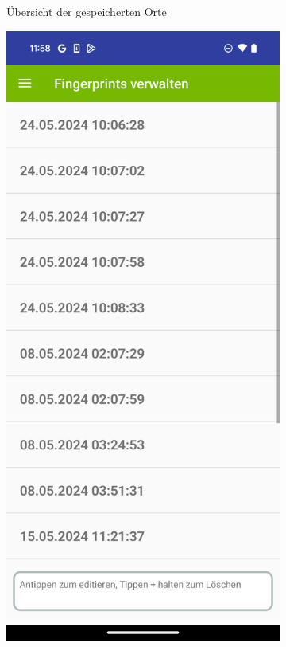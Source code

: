 \begin{figure}[h!]
\begin{subfigure}[b]{0.3\textwidth}
        \caption{Übersicht der gespeicherten Orte}
        \label{fig:bild1}
    \end{subfigure}
    \hfill
    \begin{subfigure}[b]{0.3\textwidth}
        \centering
        \includegraphics[width=\textwidth]{images/screenshots/all_measurements.png}

\end{subfigure}
\end{figure}
